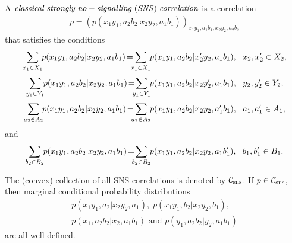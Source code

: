 \documentclass[11pt]{amsart}
\newcommand{\cl}[1]{\mathcal{#1}}
\begin{document}
\medskip

A ${\it classical \; strongly \; no-signalling \; (SNS) \; correlation}$ \cite{gt_one} is a correlation 
\begin{gather*}
	p = (p(x_{1}y_{1}, a_{2}b_{2}|x_{2}y_{2}, a_{1}b_{1}))_{x_{1}y_{1}, a_{1}b_{1}, x_{2}y_{2}, a_{2}b_{2}}
\end{gather*}
\noindent that satisfies the conditions
$$\label{sns_one}\sum_{x_1\in X_1} \hspace{-0.1cm}
p(x_1y_1, a_2b_2 | x_2y_2, a_1b_1) \hspace{-0.05cm} = \hspace{-0.2cm}
\sum_{x_1\in X_1} \hspace{-0.1cm}
p(x_1y_1, a_2b_2 | x_2'y_2, a_1b_1), \ \ x_2,x_2'\in X_2,$$
$$\label{sns_two}\sum_{y_1\in Y_1} \hspace{-0.1cm}
p(x_1y_1, a_2b_2 | x_2y_2, a_1b_1) \hspace{-0.05cm} = \hspace{-0.2cm}
\sum_{y_1\in Y_1} \hspace{-0.1cm}
p(x_1y_1, a_2b_2 | x_2y_2', a_1b_1), \ \ y_2,y_2'\in Y_2,$$
$$\label{sns_three}\sum_{a_2\in A_2} \hspace{-0.1cm}
p(x_1y_1, a_2b_2 | x_2y_2, a_1b_1) \hspace{-0.05cm} = \hspace{-0.2cm}
\sum_{a_2\in A_2} \hspace{-0.1cm}
p(x_1y_1, a_2b_2 | x_2y_2, a_1'b_1), \ \ a_1,a_1'\in A_1,$$
and
$$\label{sns_four}\sum_{b_2\in B_2} \hspace{-0.1cm}
p(x_1y_1, a_2b_2 | x_2y_2, a_1b_1) \hspace{-0.05cm} = \hspace{-0.2cm}
\sum_{b_2\in B_2} \hspace{-0.1cm}
p(x_1y_1, a_2b_2 | x_2y_2, a_1b_1'), \ \ b_1,b_1'\in B_1.$$

\noindent The (convex) collection of all SNS correlations is denoted by $\cl{C}_{\rm sns}$. If $p \in \cl{C}_{\rm sns}$, then marginal conditional probability distributions 
\begin{gather*}
	p(x_{1}y_{1}, a_{2}|x_{2}y_{2}, a_{1}), \; p(x_{1}y_{1}, b_{2}|x_{2}y_{2}, b_{1}), 
\\ 	p(x_{1}, a_{2}b_{2}|x_{2}, a_{1}b_{1}) \text{ and } p(y_{1}, a_{2}b_{2}|y_{2}, a_{1}b_{1})
\end{gather*}
\noindent are all well-defined. 
\end{document}
